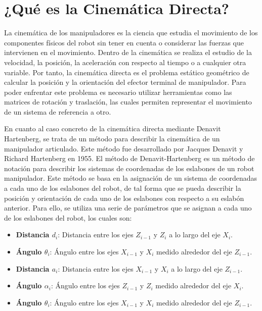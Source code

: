 \documentclass[11pt]{report}
\begin{document}
\section{¿Qué es la Cinemática Directa?}

La cinemática de los manipuladores es la ciencia que estudia el movimiento de los componentes físicos del robot sin tener en cuenta o considerar las fuerzas que intervienen en el movimiento. Dentro de la cinemática se realiza el estudio de la velocidad, la posición, la aceleración con respecto al tiempo o a cualquier otra variable. Por tanto, la cinemática directa es el problema estático geométrico de calcular la posición y la orientación del efector terminal de manipulador. Para poder enfrentar este problema es necesario utilizar herramientas como las matrices de rotación y traslación, las cuales permiten representar el movimiento de un sistema de referencia a otro.

En cuanto al caso concreto de la cinemática directa mediante Denavit Hartenberg, se trata de un método para describir la cinemática de un manipulador articulado. Este método fue desarrollado por Jacques Denavit y Richard Hartenberg en 1955. El método de Denavit-Hartenberg es un método de notación para describir los sistemas de coordenadas de los eslabones de un robot manipulador. Este método se basa en la asignación de un sistema de coordenadas a cada uno de los eslabones del robot, de tal forma que se pueda describir la posición y orientación de cada uno de los eslabones con respecto a su eslabón anterior. Para ello, se utiliza una serie de parámetros que se asignan a cada uno de los eslabones del robot, los cuales son:

\begin{itemize}
    \item \textbf{Distancia $d_i$}: Distancia entre los ejes $Z_{i-1}$ y $Z_i$ a lo largo del eje $X_i$.
    \item \textbf{Ángulo $\theta_i$}: Ángulo entre los ejes $X_{i-1}$ y $X_i$ medido alrededor del eje $Z_{i-1}$.
    \item \textbf{Distancia $a_i$}: Distancia entre los ejes $X_{i-1}$ y $X_i$ a lo largo del eje $Z_{i-1}$.
    \item \textbf{Ángulo $\alpha_i$}: Ángulo entre los ejes $Z_{i-1}$ y $Z_i$ medido alrededor del eje $X_i$.
    \item \textbf{Ángulo $\theta_i$}: Ángulo entre los ejes $X_{i-1}$ y $X_i$ medido alrededor del eje $Z_{i-1}$.
\end{itemize}
\end{document}
